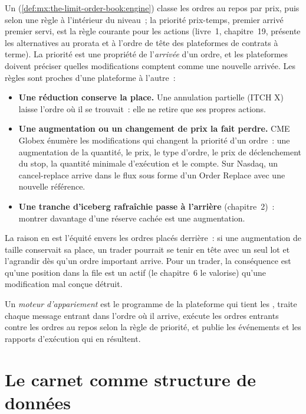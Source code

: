 Un  (\cref{def:mx:the-limit-order-book:engine}) classe les ordres au repos par prix, puis selon une règle à l'intérieur du niveau~; la priorité prix-temps,
premier arrivé premier servi, est la règle courante pour les actions (livre~1, chapitre~19, présente les alternatives au prorata et à l'ordre de tête des
plateformes de contrats à terme). La priorité est une propriété de l'\emph{arrivée} d'un ordre, et les plateformes doivent préciser quelles modifications comptent comme une nouvelle arrivée. Les règles sont proches
d'une plateforme à l'autre~:
\begin{itemize}
\item \textbf{Une réduction conserve la place.} Une annulation partielle (ITCH X) laisse l'ordre où il se trouvait~: elle ne retire que ses propres actions.
\item \textbf{Une augmentation ou un changement de prix la fait perdre.} CME Globex énumère les modifications qui changent la priorité d'un ordre~: une augmentation de la quantité,
le prix, le type d'ordre, le prix de déclenchement du stop, la quantité minimale d'exécution et le compte. Sur Nasdaq, un cancel-replace arrive dans le flux sous
forme d'un Order Replace avec une nouvelle référence.
\item \textbf{Une tranche d'iceberg rafraîchie passe à l'arrière} (chapitre~2)~: montrer davantage d'une réserve cachée est une augmentation.
\end{itemize}
La raison en est l'équité envers les ordres placés derrière~: si une augmentation de taille conservait sa place, un trader pourrait se tenir en tête avec un seul lot et l'agrandir
dès qu'un ordre important arrive. Pour un trader, la conséquence est qu'une position dans la file est un actif (le chapitre~6 le valorise) qu'une modification mal conçue
détruit.

\begin{definition}\label{def:mx:the-limit-order-book:engine}
Un \emph{moteur d'appariement} est le programme de la plateforme qui tient les , traite chaque message entrant
dans l'ordre où il arrive, exécute les ordres entrants contre les ordres au repos selon la règle de priorité, et publie les événements et les rapports d'exécution qui en résultent.
\end{definition}

\section{Le carnet comme structure de données}

